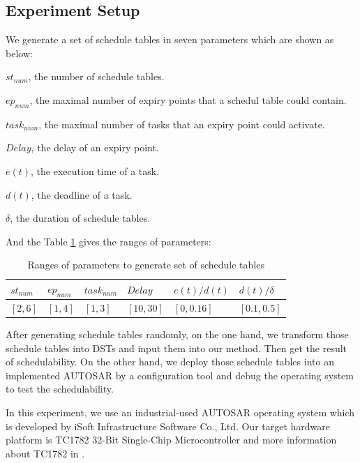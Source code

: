 \documentclass[sigconf]{acmart}
\begin{document}
\subsection{Experiment Setup}
We generate a set of schedule tables in seven parameters which are shown as below: 

\begin{compactitem}
  \item $st_{num}$, the number of schedule tables.
  \item $ep_{num}$, the maximal number of expiry points that a schedul table could contain.
  \item $task_{num}$, the maximal number of tasks that an expiry point could activate.
  \item $Delay$, the delay of an expiry point.
  \item $e(t)$, the execution time of a task.
  \item $d(t)$, the deadline of a task.
  \item $\delta$, the duration of schedule tables.
\end{compactitem}
And the Table \ref{range} gives the ranges of parameters:
\begin{table}[htbp]
  \centering
  \begin{tabular}{llllll}
    \toprule
    $st_{num}$ & $ep_{num}$ & $task_{num}$ & $Delay$ & $e(t)/d(t)$ & $d(t)/\delta$\\
    \midrule
    $[2,6]$&$[1,4]$&$[1,3]$&$[10,30]$&$[0,0.16]$&$[0.1,0.5]$\\
    \bottomrule
  \end{tabular}
  \caption{Ranges of parameters to generate set of schedule tables}\label{range}
\end{table}

After generating schedule tables randomly, on the one hand, we transform those schedule tables into DSTs and input them into our method. Then get the result of schedulability. On the other hand, we deploy those schedule tables into an implemented AUTOSAR by a configuration tool and debug the operating system to test the schedulability. 

In this experiment, we use an industrial-used AUTOSAR operating system which is developed by iSoft Infrastructure Software Co., Ltd. Our target hardware platform is TC1782 32-Bit Single-Chip Microcontroller and more information about TC1782 in \cite{infineon.org}. 
\end{document}
